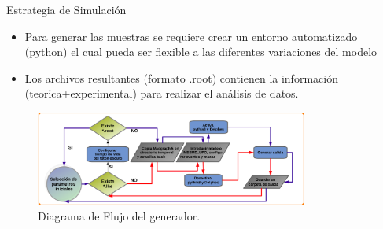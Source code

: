 \begin{frame}{Estrategia de Simulaci\'on}

\begin{itemize}
    \item Para generar las muestras se requiere crear un entorno automatizado (python) el cual pueda ser flexible a las diferentes variaciones del modelo
    \item Los archivos resultantes (formato .root) contienen la informaci\'on (teorica+experimental) para realizar el an\'alisis de datos.  
\end{itemize}

\begin{figure}[h]
\centering
\includegraphics[width=0.8\textwidth]{Imag/proyecto_darksusy2.png}
\caption{Diagrama de Flujo del generador.}
\end{figure}

    
\end{frame}


